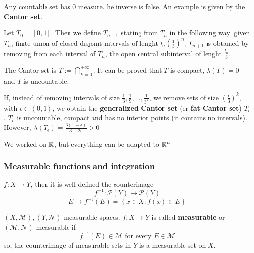 \begin{remark}
    Any countable set has \(0\) measure. he inverse is false. An example is given by the \textbf{Cantor set}.
    
    Let \(T_0 = [0,1]\). Then we define \(T_{n+1}\) stating from \(T_n\) in the following way:
    given \(T_n\), finite union of closed disjoint intervals of lenght \(l_n (\frac{1}{3})^n\), \(T_{n+1}\) is obtained by removing from each interval of \(T_n\), the open central subinterval of lenght \(\frac{l_n}{3}\).

    The Cantor set is \(T := \bigcap_{k=0}^{+\infty}\). It can be proved that \(T\) is compact, \(\lambda(T) = 0\) and \(T\) is uncountable.

    If, instead of removing intervals of size \(\frac{1}{3}, \frac{1}{9}, \ldots, \frac{1}{3^k}\), we remove sets of size \(\left(\frac{\epsilon}{3}\right)^k\), with \(\epsilon \in (0,1)\), we obtain the \textbf{generalized Cantor set} (or \textbf{fat Cantor set}) \(T_{\epsilon}\). \(T_{\epsilon}\) is uncountable, compact and has no interior points (it contains no intervals). However, \(\lambda(T_{\epsilon}) = \frac{3(1 -\epsilon)}{3 - 2\epsilon} > 0\)
\end{remark}
\begin{remark}
    We worked on \(\mathbb{R}\), but everything can be adapted to \(\mathbb{R}^n\)
\end{remark}
\subsubsection*{Measurable functions and integration}
\begin{definition}
    \(f:X \to Y\), then it is well defined the counterimage 
    \[
        f^{-1} : \mathcal{P}(Y) \to \mathcal{P}(Y)
    \]
    \[
        E \to f^{-1}(E) = \left\{ x \in X : f(x) \in E \right\}
    \]
\end{definition}
\begin{definition}
    \((X, \mathcal{M}), (Y, \mathcal{N})\) measurable spaces. \(f:X \to Y\) is called \textbf{measurable} or \((\mathcal{M}, \mathcal{N})\)-measurable if 
    \[
        f^{-1}(E) \in \mathcal{M} \mbox{ for every } E \in \mathcal{M}
    \]
    so, the counterimage of measurable sets in \(Y\) is a measurable set on \(X\).
\end{definition}
